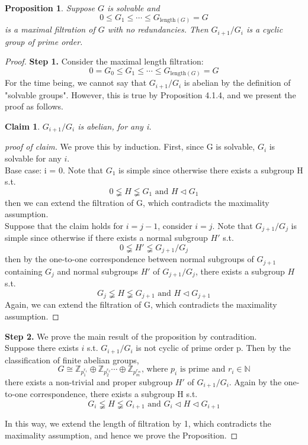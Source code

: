\documentclass[11pt]{book}
\newtheorem{proposition}[theorem]{Proposition}
\newtheorem*{claim}{Claim}
\begin{document}
\begin{proposition}\label{prop-maximalFiltrationCyclicGroups}
    Suppose $G$ is solvable and 
    \[ 
    0\leq G_{1}\leq \cdots \leq G_{\mathrm{length}(G)}=G
    \]
    is a maximal filtration of $G$ with no redundancies. Then $G_{i+1}/G_{i}$ is a cyclic group of prime order. 
\end{proposition}

\begin{proof}

   \textbf{Step 1.} Consider the maximal length filtration:
     \[ 
    0 = G_0\leq G_{1}\leq \cdots \leq G_{\mathrm{length}(G)}=G
    \]
    For the time being, we cannot say that $G_{i+1}/G_i$ is abelian by the definition of "solvable groups". However, this is true by Proposition 4.1.4, and we present the proof as follows.
    \begin{claim}$G_{i+1}/G_i$ is abelian, for any i. 
    \end{claim}

    \begin{proof}[proof of claim]
    We prove this by induction. First, since G is solvable, $G_i$ is solvable for any $i$.\\
    Base case: i = 0. Note that $G_1$ is simple since otherwise there exists a subgroup H s.t. \[0 \lneqq H \lneqq G_1 \text{ and } H \triangleleft G_1\]then we can extend the filtration of G, which contradicts the maximality assumption.  \\
    Suppose that the claim holds for $i = j-1$, consider $i = j$. Note that $G_{j+1}/G_j$ is simple since otherwise if there exists a normal subgroup $H'$ s.t. \[0 \lneqq H' \lneqq G_{j+1}/G_j\] then by the one-to-one correspondence between normal subgroups of $G_{j+1}$ containing $G_j$ and normal subgroups $H'$ of $G_{j+1}/G_j$, there exists a subgroup $H$ s.t.  \[G_j \lneqq H \lneqq G_{j+1} \text{ and } H \triangleleft G_{j+1}\] Again, we can extend the filtration of G, which contradicts the maximality assumption. 
    \end{proof}

    
    \textbf{Step 2.} We prove the main result of the proposition by contradition. \\
    Suppose there exists $i$ s.t. $G_{i+1}/G_i$ is not cyclic of prime order p. Then by the classification of finite abelian groups, \[
G \cong \mathbb{Z}_{p_1^{r_{1}}} \oplus \mathbb{Z}_{p_2^{r_{2}}}  \cdots \oplus \mathbb{Z}_{p_m^{r_{m}}} \text{, where } p_i \text{ is prime and } r_i \in \mathbb{N}
\]
there exists a non-trivial and proper subgroup $H'$ of $G_{i+1}/G_i$. 
    Again by the one-to-one correspondence, there exists a subgroup H s.t. \[G_i \lneqq H \lneqq G_{i+1} \text{ and } G_i \triangleleft H \triangleleft G_{i+1} \]
    
    In this way, we extend the length of filtration by 1, which contradicts the maximality assumption, and hence we prove the Proposition. 

\end{proof}
\end{document}
